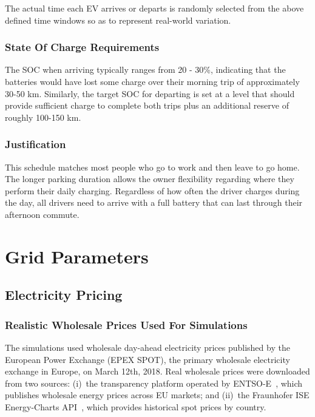 The actual time each EV arrives or departs is randomly selected from the above defined time windows so as to represent real-world variation.

\subsubsection{State Of Charge Requirements}
\label{subsec:mobility_soc_requirements}

The SOC when arriving typically ranges from 20 - 30\%, indicating that the batteries would have lost some charge over their morning trip of approximately 30-50 km. Similarly, the target SOC for departing is set at a level that should provide sufficient charge to complete both trips plus an additional reserve of roughly 100-150 km.

\subsubsection{Justification}

This schedule matches most people who go to work and then leave to go home. The longer parking duration allows the owner flexibility regarding where they perform their daily charging. Regardless of how often the driver charges during the day, all drivers need to arrive with a full battery that can last through their afternoon commute.

\section{Grid Parameters}
\label{sec:grid_parameters}

\subsection{Electricity Pricing}
\label{subsec:electricity_pricing}

\subsubsection{Realistic Wholesale Prices Used For Simulations}

The simulations used wholesale day-ahead electricity prices published by the European Power Exchange (EPEX SPOT), the primary wholesale electricity exchange in Europe, on March 12th, 2018. Real wholesale prices were downloaded from two sources: (i)~the transparency platform operated by ENTSO-E~\cite{entsoe_transparency}, which publishes wholesale energy prices across EU markets; and (ii)~the Fraunhofer ISE Energy-Charts API~\cite{energy_charts}, which provides historical spot prices by country.

